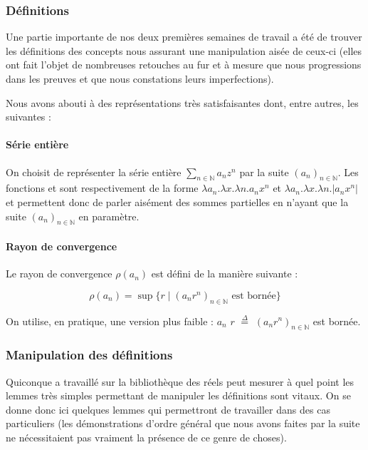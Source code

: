\subsubsection{Définitions}

Une partie importante de nos deux premières semaines de travail a été de trouver les définitions des concepts nous assurant une manipulation aisée de ceux-ci (elles ont fait l'objet de nombreuses retouches au fur et à mesure que nous progressions dans les preuves et que nous constations leurs imperfections).

Nous avons abouti à des représentations très satisfaisantes dont, entre autres, les suivantes :

\paragraph{Série entière} On choisit de représenter la série entière $\sum_{n\in \mathbb{N}} a_n z^n$ par la suite $\left(a_n\right)_{n\in \mathbb{N}}$. Les fonctions  et  sont respectivement de la forme $\lambda a_n.\lambda x.\lambda n.a_n x ^ n$ et $\lambda a_n.\lambda x.\lambda n.\left|a_n x ^ n\right|$ et permettent donc de parler aisément des sommes partielles en n'ayant que la suite $\left(a_n\right)_{n\in \mathbb{N}}$ en paramètre.

\paragraph{Rayon de convergence} Le rayon de convergence $\rho\left(a_n\right)$ est défini de la manière suivante :

$$\rho\left(a_n\right) = \sup \lbrace r \mid (a_n r^n)_{n\in \mathbb{N}} \text{ est bornée} \rbrace$$

\noindent On utilise, en pratique, une version plus faible :  $a_n$ $r$ $\stackrel{\Delta}{=}$ $\left(a_n r^n\right)_{n\in \mathbb{N}}$ est bornée.

\subsubsection{Manipulation des définitions}

Quiconque a travaillé sur la bibliothèque des réels peut mesurer à quel point les lemmes très simples permettant de manipuler les définitions sont vitaux. On se donne donc ici quelques lemmes qui permettront de travailler dans des cas particuliers (les démonstrations d'ordre général que nous avons faites par la suite ne nécessitaient pas vraiment la présence de ce genre de choses).

